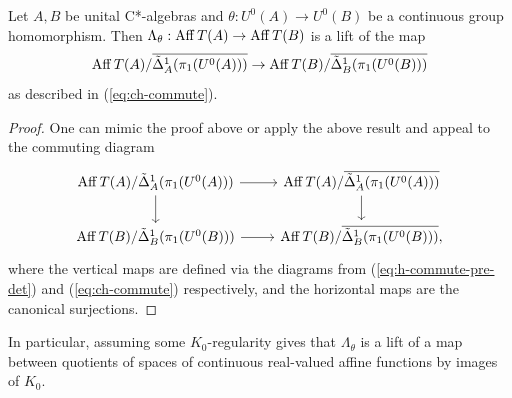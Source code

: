 \documentclass[12pt]{amsart}
\begin{document}
\begin{prop}\label{prop:S-theta-is-a-lift-H}
Let $A,B$ be unital C*-algebras and $\theta: U^0(A) \to U^0(B)$ be a continuous group homomorphism. Then $\Lambda_\theta: \operatorname{Aff} T(A) \to \operatorname{Aff} T(B)$ is a lift of the map
\begin{equation}
\operatorname{Aff} T(A)/\overline{\tilde{\Delta}_A^1(\pi_1(U^0(A)))} \to \operatorname{Aff} T(B)/\overline{\tilde{\Delta}_B^1(\pi_1(U^0(B)))}
\end{equation}
as described in (\ref{eq:ch-commute}).
\begin{proof}
One can mimic the proof above or apply the above result and appeal to the commuting diagram 
\begin{equation}
\begin{tikzcd}
 \Aff T(A)/\tD_A^1(\pi_1(U^0(A))) \arrow[d] \arrow[r] &  \Aff T(A)/\ov{\tD_A^1(\pi_1(U^0(A)))} \arrow[d] \\
\Aff T(B)/\tD_B^1(\pi_1(U^0(B)))    \arrow[r]         & \Aff T(B)/\ov{\tD_B^1(\pi_1(U^0(B)))},           
\end{tikzcd}
\end{equation}
where the vertical maps are defined via the diagrams from (\ref{eq:h-commute-pre-det}) and (\ref{eq:ch-commute}) respectively, and the horizontal maps are the canonical surjections. 
\end{proof}
\end{prop}


In particular, assuming some $K_0$-regularity gives that $\Lambda_\theta$ is a lift of a map between quotients of spaces of continuous real-valued affine functions by images of $K_0$.
\end{document}
